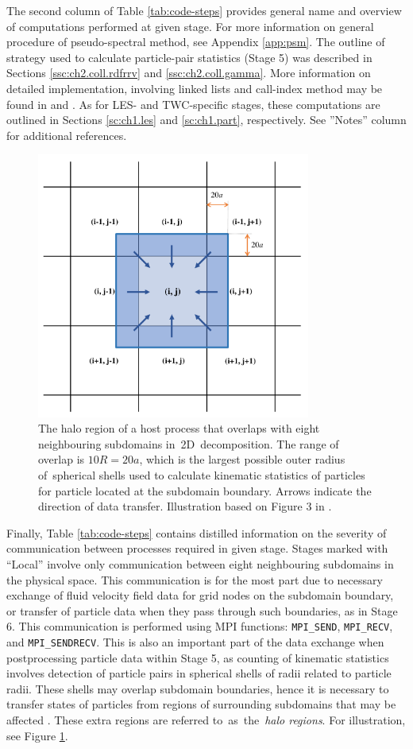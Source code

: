 \documentclass{pracamgren}
\begin{document}
The second column of Table \ref{tab:code-steps} provides general name and overview of computations performed at given stage.
For more information on general procedure of pseudo-spectral method, see Appendix \ref{app:psm}.
The outline of strategy used to calculate particle-pair statistics (Stage 5) was described in Sections \ref{ssc:ch2.coll.rdfrrv} and \ref{ssc:ch2.coll.gamma}.
More information on detailed implementation, involving linked lists and call-index method may be found in \textcite{Allen1987} and \textcite{Onishi2013}.
As for LES- and TWC-specific stages, these computations are outlined in Sections \ref{sc:ch1.les} and \ref{sc:ch1.part}, respectively.
See ''Notes'' column for additional references.

\begin{figure}[h]
\centering
\includegraphics[width=9cm]{img/figs/halo.pdf}
\caption{
The halo region of a host process that overlaps with eight neighbouring subdomains in~2D~decomposition.
The range of overlap is $10R = 20a$, which is the largest possible outer radius of~spherical shells used to calculate kinematic statistics of particles for particle located at the subdomain boundary.
Arrows indicate the direction of data transfer.
Illustration based on Figure 3 in \textcite{Ayala2014}. 
}
\label{fig:halo}
\end{figure}

Finally, Table \ref{tab:code-steps} contains distilled information on the severity of communication between processes required in given stage.
Stages marked with ``Local'' involve only communication between eight neighbouring subdomains in the physical space.
This communication is for the most part due to necessary exchange of fluid velocity field data for grid nodes on the subdomain boundary, or transfer of particle data when they pass through such boundaries, as in Stage 6.
This communication is performed using MPI functions: \texttt{MPI\_SEND}, \texttt{MPI\_RECV}, and \texttt{MPI\_SENDRECV}.
This is also an important part of the data exchange when postprocessing particle data within Stage 5, as counting of kinematic statistics involves detection of particle pairs in spherical shells of radii related to particle radii.
These shells may overlap subdomain boundaries, hence it is necessary to transfer states of particles from regions of surrounding subdomains that may be affected \parencite{Ayala2014}.
These extra regions are referred to~as~the~\emph{halo regions}.
For illustration, see Figure \ref{fig:halo}.
\end{document}
